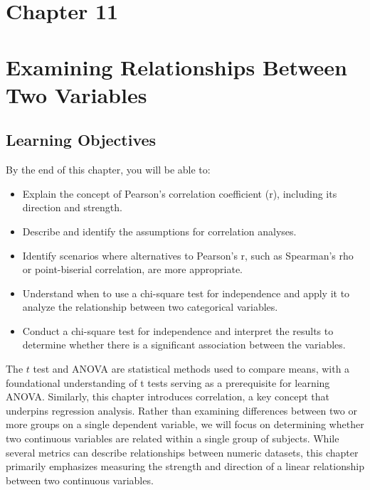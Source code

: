 \documentclass[
  letterpaper,
  DIV=11,
  numbers=noendperiod]{scrreprt}
\begin{document}

\chapter{Chapter 11}\label{chapter-11}


\chapter*{Examining Relationships Between Two
Variables}\label{examining-relationships-between-two-variables}


\section*{Learning Objectives}\label{learning-objectives-10}


By the end of this chapter, you will be able to:

\begin{itemize}
\item
  Explain the concept of Pearson's correlation coefficient (r),
  including its direction and strength.
\item
  Describe and identify the assumptions for correlation analyses.
\item
  Identify scenarios where alternatives to Pearson's r, such as
  Spearman's rho or point-biserial correlation, are more appropriate.
\item
  Understand when to use a chi-square test for independence and apply it
  to analyze the relationship between two categorical variables.
\item
  Conduct a chi-square test for independence and interpret the results
  to determine whether there is a significant association between the
  variables.
\end{itemize}

The \(t\) test and ANOVA are statistical methods used to compare means,
with a foundational understanding of t tests serving as a prerequisite
for learning ANOVA. Similarly, this chapter introduces correlation, a
key concept that underpins regression analysis. Rather than examining
differences between two or more groups on a single dependent variable,
we will focus on determining whether two continuous variables are
related within a single group of subjects. While several metrics can
describe relationships between numeric datasets, this chapter primarily
emphasizes measuring the strength and direction of a linear relationship
between two continuous variables.
\end{document}

